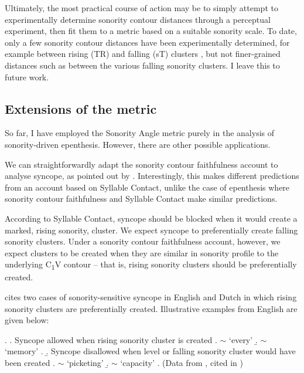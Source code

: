 \documentclass[12pt]{article}
\begin{document}
\bigskip

Ultimately, the most practical course of action may be to simply attempt to experimentally determine sonority contour distances through a perceptual experiment, then fit them to a metric based on a suitable sonority scale. To date, only a few sonority contour distances have been experimentally determined, for example between rising (TR) and falling (sT) clusters \citep{fleischhacker.2002}, but not finer-grained distances such as between the various falling sonority clusters. I leave this to future work.

\subsection{Extensions of the metric}

So far, I have employed the {\sc Sonority Angle} metric purely in the analysis of sonority-driven epenthesis. However, there are other possible applications.

\bigskip

 We can straightforwardly adapt the sonority contour faithfulness account to analyse syncope, as pointed out by \citet{flemming.2008}. Interestingly, this makes different predictions from an account based on Syllable Contact, unlike the case of epenthesis where sonority contour faithfulness and Syllable Contact make similar predictions. 

According to Syllable Contact, syncope should be blocked when it would create a marked, rising sonority, cluster. We expect syncope to preferentially create falling sonority clusters. Under a sonority contour faithfulness account, however, we expect clusters to be created when they are similar in sonority profile to the underlying C\textsubscript{1}V contour -- that is, rising sonority clusters should be preferentially created.

\citet{flemming.2008} cites two cases of sonority-sensitive syncope in English and Dutch in which rising sonority clusters are preferentially created. Illustrative examples from English are given below:

\ex. \a. Syncope allowed when rising sonority cluster is created
     \a.  $\sim$  `every'
     \b.  $\sim$  `memory'
     \z.
     \b. Syncope disallowed when level or falling sonority cluster would have been created
     \a.  $\sim$  `picketing'
     \b.  $\sim$  `capacity'
     \z.
     (Data from \citep{hooper.1978}, cited in \citep{flemming.2008})
\end{document}
